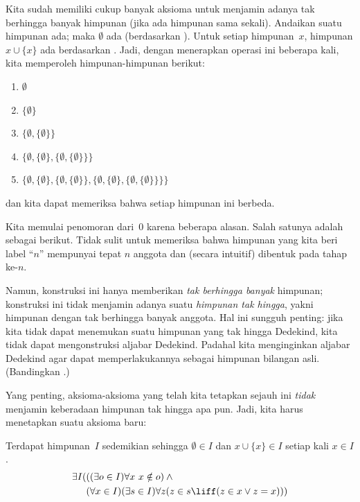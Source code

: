 \documentclass[../../../include/open-logic-section]{subfiles}
\begin{document}

Kita sudah memiliki cukup banyak aksioma untuk menjamin adanya tak berhingga
banyak himpunan (jika ada himpunan sama sekali). Andaikan suatu himpunan ada;
maka $\emptyset$ ada (berdasarkan
). Untuk setiap himpunan~$x$, himpunan
$x\cup\{x\}$ ada berdasarkan
. Jadi, dengan menerapkan operasi
ini beberapa kali, kita memperoleh himpunan-himpunan berikut:
\begin{enumerate}
	\item[0.] $\emptyset$ %
	\item[1.] $ \{\emptyset\}$ %
	\item[2.] $\{\emptyset, \{\emptyset\}\}$ %
	\item[3.] $\{\emptyset, \{\emptyset\}, \{\emptyset, \{\emptyset\}\}\}$ %
	\item[4.] $\{\emptyset, \{\emptyset\}, \{\emptyset, \{\emptyset\}\}, \{\emptyset, \{\emptyset\}, \{\emptyset, \{\emptyset\}\}\}\}$%
\end{enumerate}
dan kita dapat memeriksa bahwa setiap himpunan ini berbeda.

Kita memulai penomoran dari~$0$ karena beberapa alasan. Salah satunya adalah
sebagai berikut. Tidak sulit untuk memeriksa bahwa himpunan yang kita beri
label ``$n$'' mempunyai tepat $n$ anggota dan (secara intuitif) dibentuk pada
tahap ke-$n$.

Namun, konstruksi ini hanya memberikan \emph{tak berhingga banyak} himpunan;
konstruksi ini tidak menjamin adanya suatu \emph{himpunan tak hingga}, yakni
himpunan dengan tak berhingga banyak anggota. Hal ini sungguh penting: jika
kita tidak dapat menemukan suatu himpunan yang tak hingga Dedekind, kita tidak
dapat mengonstruksi aljabar Dedekind. Padahal kita menginginkan aljabar
Dedekind agar dapat memperlakukannya sebagai himpunan bilangan asli.
(Bandingkan .)

Yang penting, aksioma-aksioma yang telah kita tetapkan sejauh ini
\emph{tidak} menjamin keberadaan himpunan tak hingga apa pun. Jadi, kita harus
menetapkan suatu aksioma baru:

\begin{axiom}[Ketakhinggaan]
Terdapat himpunan~$I$ sedemikian sehingga $\emptyset\in I$ dan
$x\cup\{x\}\in I$ setiap kali $x\in I$.
\begin{align*}
	\exists I( & ((\exists o \in I)\forall x\ x \notin o) \land {}\\
	& (\forall x \in I)(\exists s \in I)\forall z(z \in s \liff (z \in x \lor z = x)))
\end{align*}
\end{axiom}
\end{document}
